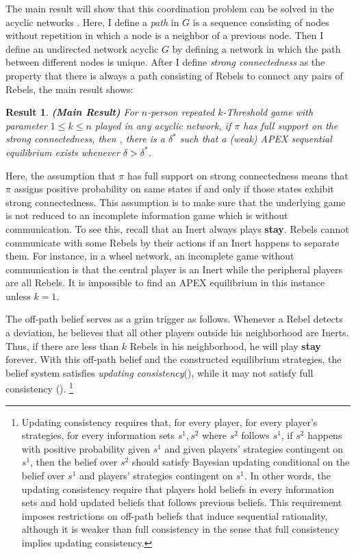 \documentclass[12pt,letter]{article}
\newtheorem{result}{Result}
\theoremstyle{definition}
\theoremstyle{remark}
\theoremstyle{claim}
\begin{document}
The main result will show that this coordination problem can be solved in the {acyclic} networks . Here, I define a \textit{path} in $G$ is a sequence consisting of nodes without repetition in which a node is a neighbor of a previous node. Then I define an undirected network acyclic $G$ by defining a network in which the path between different nodes is unique. After I define \textit{strong connectedness} as the property that there is always a path consisting of Rebels to connect any pairs of Rebels,  the main result shows:

\begin{result}\textbf{(Main Result)}
For $n$-person repeated $k$-Threshold game with parameter $1\leq k \leq n$ played in any acyclic network, if $\pi$ has full support on the strong connectedness, then , there is a $\delta^{*}$ such that a (weak) APEX sequential equilibrium exists whenever $\delta>\delta^{*}$.  
\end{result}

Here, the assumption that $\pi$ has full support on strong connectedness means that $\pi$ assigns positive probability on same states if and only if those states exhibit strong connectedness. This assumption is to make sure that the underlying game is not reduced to an incomplete information game which is without communication.  To see this, recall that an Inert always plays \textbf{stay}. Rebels cannot communicate with some Rebels by their actions if an Inert happens to separate them. For instance, in a wheel network, an incomplete game without communication is that the central player is an Inert while the peripheral players are all Rebels. It is impossible to find an APEX equilibrium in this instance unless $k=1$.

The off-path belief serves as a grim trigger as follows. Whenever a Rebel detects a deviation, he believes that all other players outside his neighborhood are Inerts. Thus, if there are less than $k$ Rebels in his neighborhood, he will play \textbf{stay} forever. With this off-path belief and the constructed equilibrium strategies, the belief system satisfies \textit{updating consistency}(\citep{Perea2002}), while it may not satisfy full consistency (\citep{Krep_Wilson1982}). \footnote{ Updating consistency requires that, for every player, for every player's strategies, for every information sets $s^1,s^2$ where $s^2$ follows $s^1$, if $s^2$ happens with positive probability given $s^1$ and given players' strategies contingent on $s^1$, then the belief over $s^2$ should satisfy Bayesian updating conditional on the belief over $s^1$ and players' strategies contingent on $s^1$. In other words, the updating consistency require that players hold beliefs in every information sets and hold updated beliefs that follows previous beliefs. This requirement imposes restrictions on off-path beliefs that induce sequential rationality, although it is weaker than full consistency in the sense that full consistency implies updating consistency.}
\end{document}
